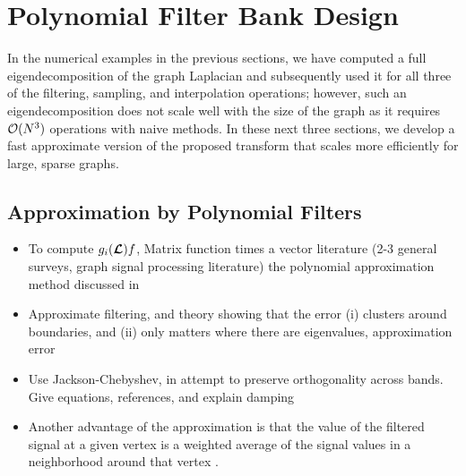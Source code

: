 \documentclass[journal, 10pt]{IEEEtran}
\begin{document}
{\color{blue}
\section{Polynomial Filter Bank Design}
In the numerical examples in the previous sections, we have computed a full eigendecomposition of the graph Laplacian and subsequently used it for all three of the filtering, sampling, and interpolation operations; however, such an eigendecomposition does not scale well with the size of the graph as it requires ${\cal O}(N^3)$ operations with naive methods. In these next three sections, we develop a fast approximate version of the proposed transform that scales more efficiently for large, sparse graphs. 

\subsection{Approximation by Polynomial Filters} 

\begin{itemize}
\item To compute $g_i(\boldsymbol{\mathcal{L}})f$, Matrix function times a vector literature (2-3 general surveys, graph signal processing literature) the polynomial approximation method discussed in \cite{hammond2011wavelets,shuman_DCOSS_2011}
\item Approximate filtering, and theory showing that the error (i) clusters around boundaries, and (ii) only matters where there are eigenvalues, approximation error
\item Use Jackson-Chebyshev, in attempt to preserve orthogonality across bands. Give equations, references, and explain damping
\item Another advantage of the approximation is that the value of the filtered signal at a given vertex is a weighted average of the signal values in a neighborhood around that vertex \cite{shuman2013emerging}. 
\end{itemize}

}
\end{document}
